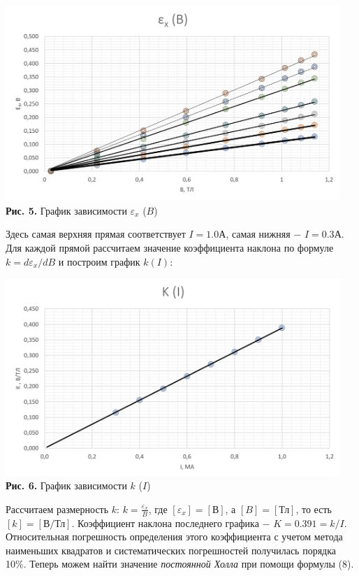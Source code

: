 \documentclass[a4paper,12pt]{article} %
\begin{document}
\begin{center}
\includegraphics[width=0.95\textwidth]{3.3.4_5.png}\\
\textbf{Рис. 5.} График зависимости $\varepsilon_{x}$ ($B$)~\\
\end{center}

\hfill \break Здесь самая верхняя прямая соответствует $I = 1.0$А, самая нижняя $-$ $I = 0.3$А. Для каждой прямой рассчитаем значение коэффициента наклона по формуле $k = d\varepsilon_{x}/dB$ и построим график $k(I)$:

\begin{center}
\includegraphics[width=0.95\textwidth]{3.3.4_6.png}\\
\textbf{Рис. 6.} График зависимости $k$ ($I$)~\\
\end{center}

\hfill \break Рассчитаем размерность $k$: $k = \frac{\varepsilon_{x}}{B}$, где $[\varepsilon_{x}] = [\text{В}]$, а $[B] = [\text{Тл}]$, то есть $[k] = [\text{В/Тл}]$. Коэффициент наклона последнего графика $-$ $K = 0.391 = k / I$. Относительная погрешность определения этого коэффициента с учетом метода наименьших квадратов и систематических погрешностей получилась порядка 10\%. Теперь можем найти значение \textit{постоянной Холла} при помощи формулы (8). 
\end{document}
